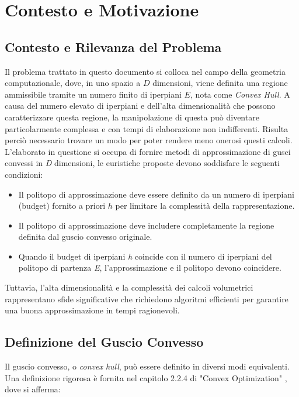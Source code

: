 \chapter{Contesto e Motivazione}

\section{Contesto e Rilevanza del Problema}

Il problema trattato in questo documento si colloca nel campo della geometria computazionale, 
dove, in uno spazio a $D$ dimensioni, viene definita una regione ammissibile tramite un 
numero finito di iperpiani $E$, nota come \textit{Convex Hull}.
A causa del numero elevato di iperpiani e dell'alta dimensionalità che possono caratterizzare
questa regione, la manipolazione di questa può diventare particolarmente complessa 
e con tempi di elaborazione non indifferenti.
Risulta perciò necessario trovare un modo per poter rendere meno onerosi questi calcoli.\\

L'elaborato in questione si occupa di fornire metodi di approssimazione di gusci
convessi in \textit{D} dimensioni, le euristiche proposte devono soddisfare le seguenti condizioni:
\begin{itemize}
    \item Il politopo di approssimazione deve essere definito da un numero 
    di iperpiani (budget) fornito a priori $h$ per limitare la complessità della rappresentazione.
    \item Il politopo di approssimazione deve includere completamente la regione 
    definita dal guscio convesso originale.
    \item Quando il budget di iperpiani \textit{h} coincide con il numero di iperpiani del
    politopo di partenza \textit{E}, l'approssimazione e il politopo devono coincidere.
\end{itemize}

Tuttavia, l'alta dimensionalità e la complessità dei calcoli volumetrici rappresentano 
sfide significative che richiedono algoritmi efficienti per garantire una buona 
approssimazione in tempi ragionevoli.

\pagebreak

\section{Definizione del Guscio Convesso}

Il guscio convesso, o \textit{convex hull}, può essere definito in diversi modi equivalenti.\\
Una definizione rigorosa è fornita nel capitolo 2.2.4 di "Convex Optimization" 
\cite*{PolyhedraDefinition}, dove si afferma:


